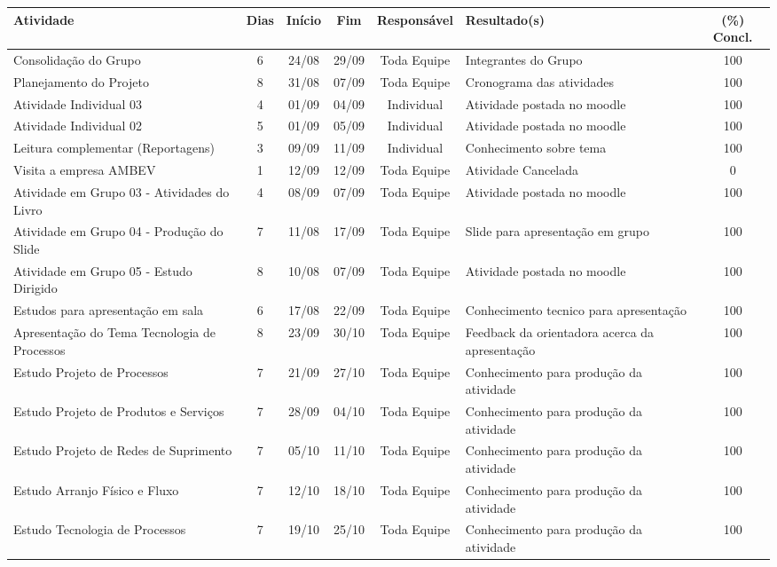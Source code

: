 \begin{landscape}
\begin{table}[h]
\begin{tabular}{|p{7cm}|c|c|c|c|p{4cm}|c|}
				Atividade & Dias & Início & Fim & Responsável & Resultado(s) & (\%) Concl. \\ \hline
				Consolidação do Grupo & 6 & 24/08 & 29/09 & Toda Equipe & Integrantes do Grupo & 100 \\ \hline
				Planejamento do Projeto & 8 & 31/08 & 07/09 & Toda Equipe & Cronograma das atividades & 100 \\ \hline
				Atividade Individual 03 & 4 & 01/09 & 04/09 & Individual & Atividade postada no moodle & 100 \\ \hline
				Atividade Individual 02 & 5 & 01/09 & 05/09 & Individual & Atividade postada no moodle & 100 \\ \hline
				Leitura complementar (Reportagens) & 3 & 09/09 & 11/09 & Individual & Conhecimento sobre tema & 100 \\ \hline
				Visita a empresa AMBEV & 1 & 12/09 & 12/09 & Toda Equipe & Atividade Cancelada & 0 \\ \hline
				Atividade em Grupo 03 - Atividades do Livro & 4 & 08/09 & 07/09 & Toda Equipe & Atividade postada no moodle & 100 \\ \hline
				Atividade em Grupo 04 - Produção do Slide & 7 & 11/08 & 17/09 & Toda Equipe & Slide para apresentação em grupo & 100 \\ \hline
				Atividade em Grupo 05 - Estudo Dirigido & 8 & 10/08 & 07/09 & Toda Equipe & Atividade postada no moodle & 100 \\ \hline
				Estudos para apresentação em sala & 6 & 17/08 & 22/09 & Toda Equipe & Conhecimento tecnico para apresentação & 100 \\ \hline
				Apresentação do Tema Tecnologia de Processos\footnotemark[1]& 8 & 23/09 & 30/10 & Toda Equipe & Feedback da orientadora acerca da apresentação & 100 \\ \hline
				Estudo Projeto de Processos & 7 & 21/09 & 27/10 & Toda Equipe & Conhecimento para produção da atividade & 100 \\ \hline
				Estudo Projeto de Produtos e Serviços & 7 & 28/09 & 04/10 & Toda Equipe & Conhecimento para produção da atividade & 100 \\ \hline
				Estudo Projeto de Redes de Suprimento & 7 & 05/10 & 11/10 & Toda Equipe & Conhecimento para produção da atividade & 100 \\ \hline
				Estudo Arranjo Físico e Fluxo & 7 & 12/10 & 18/10 & Toda Equipe & Conhecimento para produção da atividade & 100 \\ \hline
				Estudo Tecnologia de Processos & 7 & 19/10 & 25/10 & Toda Equipe & Conhecimento para produção da atividade & 100 \\ \hline

\end{tabular}
\end{table}
\end{landscape}
